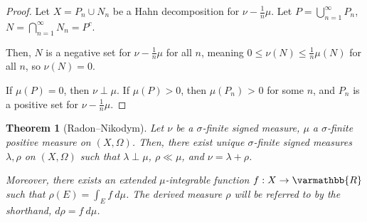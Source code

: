 \documentclass[10pt]{extarticle}
\newcommand{\R}{\mathbb{R}}
\theoremstyle{plain}
\newtheorem*{theorem}{Theorem}
\theoremstyle{definition}
\theoremstyle{note}
\renewcommand*{\mathbb}[1]{\varmathbb{#1}}
\renewcommand{\newline}{\hfill\break}
\begin{document}
\begin{proof}
  Let $X = P_n \cup N_n$ be a Hahn decomposition for $\nu - \frac{1}{n}\mu$. Let $P = \bigcup_{n=1}^{\infty}P_n$, $N = \bigcap_{n=1}^{\infty}N_n = P^{c}$.\newline

  Then, $N$ is a negative set for $\nu - \frac{1}{n}\mu$ for all $n$, meaning $0 \leq \nu(N) \leq \frac{1}{n}\mu(N)$ for all $n$, so $\nu\left(N\right) = 0$. \newline

  If $\mu(P) = 0$, then $\nu \perp \mu$. If $\mu(P) > 0$, then $\mu\left(P_n\right)$ > 0 for some $n$, and $P_n$ is a positive set for $\nu - \frac{1}{n}\mu$.
\end{proof}
\begin{theorem}[Radon--Nikodym]
  Let $\nu$ be a $\sigma$-finite signed measure, $\mu$ a $\sigma$-finite positive measure on $(X,\Omega)$. Then, there exist unique $\sigma$-finite signed measures $\lambda,\rho$ on $(X,\Omega)$ such that $\lambda \perp \mu$, $\rho \ll \mu$, and $\nu = \lambda + \rho$.\newline

  Moreover, there exists an extended $\mu$-integrable function $f: X\rightarrow \R$ such that $\rho(E) = \int_{E}^{} f\:d\mu$. The derived measure $\rho$ will be referred to by the shorthand, $d\rho = f\:d\mu$.
\end{theorem}
\end{document}
